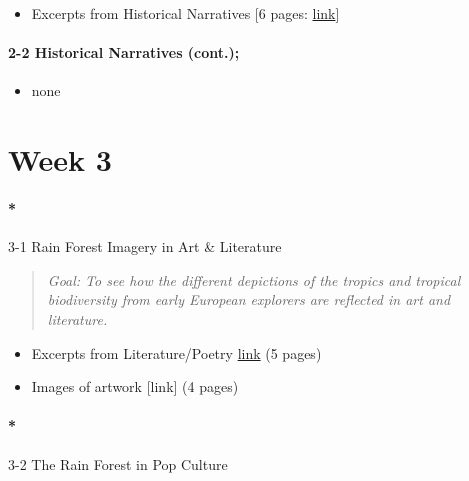 \documentclass[
  10pt,
  letterpaper,
  oneside,
  open=any]{scrbook}
\let\oldparagraph\paragraph
\renewcommand{\paragraph}[1]{\oldparagraph{#1}\mbox{}}
\providecommand{\tightlist}{%
  \setlength{\itemsep}{0pt}\setlength{\parskip}{0pt}}\usepackage{longtable,booktabs,array}
\begin{document}
\begin{itemize}
\tightlist
\item
  Excerpts from Historical Narratives {[}6 pages:
  \href{https://ids2935.netlify.app/uploads/historical_narratives.pdf}{link}{]}
\end{itemize}

\paragraph{2-2 Historical Narratives
(cont.);}\label{historical-narratives-cont.}

\begin{itemize}
\tightlist
\item
  none
\end{itemize}

\section*{Week 3}\label{week-3}


\paragraph*{3-1 Rain Forest Imagery in Art \&
Literature}\label{rain-forest-imagery-in-art-literature}

\begin{quote}
\emph{Goal: To see how the different depictions of the tropics and
tropical biodiversity from early European explorers are reflected in art
and literature.}
\end{quote}

\begin{itemize}
\item
  Excerpts from Literature/Poetry
  \href{https://ids2935.netlify.app/03_trf_culture/lit_poetry.pdf}{link}
  (5 pages)
\item
  Images of artwork {[}link{]} (4 pages)
\end{itemize}

\paragraph*{3-2 The Rain Forest in Pop
Culture}\label{the-rain-forest-in-pop-culture}
\end{document}
